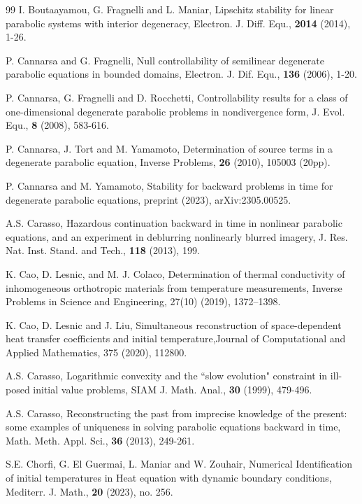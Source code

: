 \documentclass[reqno]{amsart}
\theoremstyle{plain}
\theoremstyle{remark}
\numberwithin{equation}{section}
\begin{document}
\begin{thebibliography}{99}
 I. Boutaayamou, G. Fragnelli and L. Maniar, Lipschitz stability for linear parabolic systems with interior degeneracy, Electron. J. Diff. Equ., \textbf{2014} (2014), 1-26.

 P. Cannarsa and G. Fragnelli, Null controllability of semilinear degenerate parabolic equations in bounded domains, Electron. J. Dif. Equ., \textbf{136} (2006), 1-20.

 P. Cannarsa, G. Fragnelli and D. Rocchetti, Controllability results for a class of one-dimensional degenerate parabolic problems in nondivergence form, J. Evol. Equ., {\bf 8} (2008), 583-616.

 P. Cannarsa, J. Tort and M. Yamamoto, Determination of source terms in a degenerate parabolic equation, Inverse Problems, \textbf{26} (2010), 105003 (20pp).

 P. Cannarsa and M. Yamamoto, Stability for backward problems in time for degenerate parabolic equations, preprint (2023), arXiv:2305.00525.

 A.S. Carasso, Hazardous continuation backward in time in nonlinear parabolic equations, and an experiment in deblurring nonlinearly blurred imagery, J. Res. Nat. Inst. Stand. and Tech., \textbf{118} (2013), 199.

K. Cao, D. Lesnic, and M. J. Colaco, Determination of thermal conductivity of inhomogeneous orthotropic materials from temperature measurements,
Inverse Problems in Science and Engineering,
27(10) (2019), 1372--1398.

K. Cao, D. Lesnic and J. Liu,
Simultaneous reconstruction of space-dependent heat transfer coefficients and initial temperature,Journal of Computational and Applied Mathematics,
375 (2020), 112800.

 A.S. Carasso, Logarithmic convexity and the “slow evolution" constraint in ill-posed initial value problems, SIAM J. Math. Anal., \textbf{30} (1999), 479-496.

 A.S. Carasso, Reconstructing the past from imprecise knowledge of the present: some examples of uniqueness in solving parabolic equations backward in time, Math. Meth. Appl. Sci., \textbf{36} (2013), 249-261.

 S.E. Chorfi, G. El Guermai, L. Maniar and W. Zouhair, Numerical Identification of initial temperatures in Heat equation with dynamic boundary conditions, Mediterr. J. Math., \textbf{20} (2023), no. 256.


\end{thebibliography}
\end{document}
